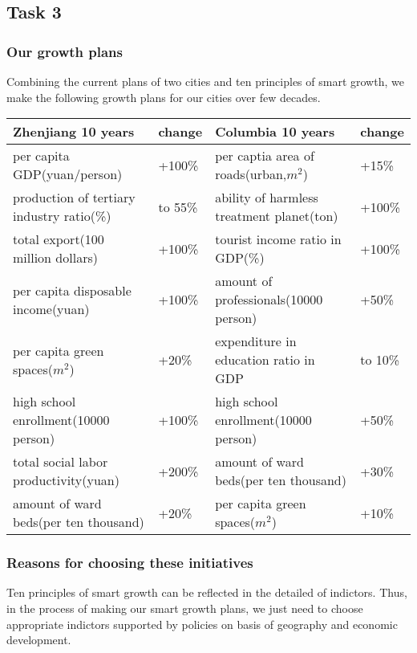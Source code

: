 \documentclass{mcmthesis}
\begin{document}
\subsection{Task 3}%
\subsubsection{Our growth plans}%
Combining the current plans of two cities and ten principles of smart growth, we make the following growth plans for our cities over few decades.\\
\begin{table}[h]
\setlength{\abovecaptionskip}{0pt}
\setlength{\belowcaptionskip}{0pt}
\begin{tabular}{p{5.3cm}|p{1.2cm}|p{5.2cm}|p{1.2cm}}
\hline
\bf Zhenjiang 10 years	& \bf change	 & \bf Columbia 10 years	& \bf change \\
\hline
 per capita GDP(yuan/person)	& +100\%	& per captia area of roads(urban,$m^2$)	& +15\% \\
production of tertiary industry ratio(\%)	& to 55\%	& ability of harmless treatment planet(ton)	& +100\% \\
total export(100 million dollars)	& +100\%	& tourist income ratio in GDP(\%)	& +100\% \\
per capita disposable income(yuan)	& +100\%	& amount of professionals(10000 person)	& +50\% \\
 per capita green spaces($m^2$)	& +20\%	& expenditure in education ratio in GDP	& to 10\% \\
 high school enrollment(10000 person)	& +100\%	& high school enrollment(10000 person)	& +50\% \\
total social labor productivity(yuan)	& +200\%	& amount of ward beds(per ten thousand)	& +30\% \\
amount of ward beds(per ten thousand)	& +20\%	& per capita green spaces($m^2$)	& +10\% \\
\hline
\end{tabular}
\end{table}

\subsubsection{Reasons for choosing these initiatives}%
Ten principles of smart growth can be reflected in the detailed of indictors. Thus, in the process of making our smart growth plans, we just need to choose appropriate indictors supported by policies on basis of geography and economic development.\\
\end{document}
